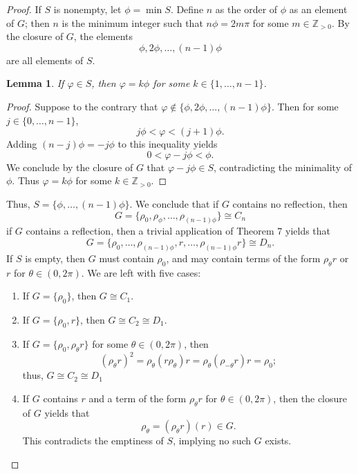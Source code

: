 \documentclass[11pt]{article}
\newtheorem{lemma}{Lemma}
\begin{document}
\begin{adjustwidth}{1cm}{}
\begin{proof}
		If $S$ is nonempty, let $\phi = \min S$. Define $n$ as the order of $\phi$ as an element of $G$; then $n$ is the minimum integer such that $n \phi = 2 m \pi$ for some $m \in \mathbb{Z}_{> 0}$. By the closure of $G$, the elements
		\[
			\phi, 2\phi, \ldots, (n - 1) \phi
		\]
		are all elements of $S$.
		\begin{adjustwidth}{1cm}{}
			\begin{lemma}
				If $\varphi \in S$, then $\varphi = k \phi$ for some $k \in \{ 1, \ldots, n - 1 \}$.
			\end{lemma}
			\begin{proof}\renewcommand{\qedsymbol}{}
				Suppose to the contrary that $\varphi \notin \{ \phi, 2\phi, \ldots, (n - 1) \phi \}$. Then for some $j \in \{ 0, \ldots, n - 1 \}$,
				\[
					j \phi < \varphi < (j + 1) \phi.
				\]
				Adding $(n - j) \phi = -j \phi$ to this inequality yields
				\[
					0 < \varphi - j \phi < \phi.
				\]	
				We conclude by the closure of $G$ that $\varphi - j \phi \in S$, contradicting the minimality of $\phi$. Thus $\varphi = k \phi$ for some $k \in \mathbb{Z}_{> 0}$.
			\end{proof}
		\end{adjustwidth}
		Thus, $S = \{ \phi, \ldots, (n - 1) \phi \}$. We conclude that if $G$ contains no reflection, then 
		\[
			G = \{ \rho_{0}, \rho_{\phi}, \ldots, \rho_{(n - 1) \phi} \} \cong C_{n}
		\]
	if $G$ contains a reflection, then a trivial application of Theorem 7 yields that 
	\[
		G = \{ \rho_{0}, \ldots, \rho_{(n - 1) \phi}, r, \ldots, \rho_{(n - 1) \phi} r \} \cong D_{n}.
	\]
	\newpage
	If $S$ is empty, then $G$ must contain $\rho_{0}$, and may contain terms of the form $\rho_{\theta} r$ or $r$ for $\theta \in (0, 2\pi)$. We are left with five cases:
	\begin{enumerate}
		\item If $G = \{ \rho_{0} \}$, then $G \cong C_{1}$.
		\item If $G = \{ \rho_{0}, r \}$, then $G \cong C_{2} \cong D_{1}$.
		\item If $G = \{ \rho_{0}, \rho_{\theta} r \}$ for some $\theta \in (0, 2\pi)$, then
		\[
			(\rho_{\theta} r)^{2} = \rho_{\theta} (r \rho_{\theta}) r = \rho_{\theta} (\rho_{-\theta} r) r = \rho_{0};
		\]
		thus, $G \cong C_{2} \cong D_{1}$
		\item If $G$ contains $r$ and a term of the form $\rho_{\theta} r$ for $\theta \in (0, 2\pi)$, then the closure of $G$ yields that
		\[
			\rho_{\theta} = (\rho_{\theta} r) (r) \in G.
		\]
		This contradicts the emptiness of $S$, implying no such $G$ exists.

\end{enumerate}
\end{proof}
\end{adjustwidth}
\end{document}
